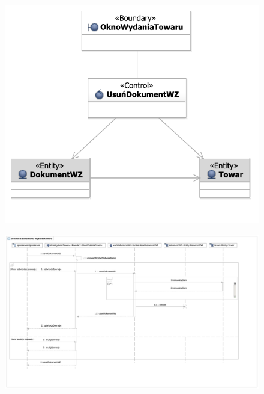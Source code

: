 \begin{figure}[H]
  \centering
  \includegraphics[angle=\ecbangle, scale=\ecbscale]{../img/usecase/pu15ecb.pdf}
  \caption{}
\end{figure}

\begin{figure}[H]
  \centering
  \includegraphics[angle=\seqangle, scale=0.42]{../img/usecase/pu15seq.pdf}
  \caption{}
\end{figure}
\newpage

